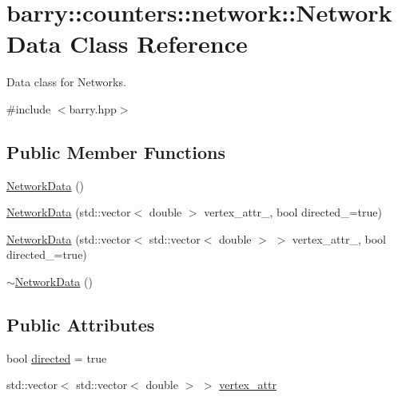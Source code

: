 \hypertarget{classbarry_1_1counters_1_1network_1_1_network_data}{}\section{barry\+:\+:counters\+:\+:network\+:\+:Network\+Data Class Reference}
\label{classbarry_1_1counters_1_1network_1_1_network_data}


Data class for Networks.  




{\ttfamily \#include $<$barry.\+hpp$>$}

\subsection*{Public Member Functions}
\begin{DoxyCompactItemize}
\item 
\hyperlink{classbarry_1_1counters_1_1network_1_1_network_data_a285d956b719012c5296aa537aca17fb2}{Network\+Data} ()
\item 
\hyperlink{classbarry_1_1counters_1_1network_1_1_network_data_a6db461d607e95bc04dfb527f3422142d}{Network\+Data} (std\+::vector$<$ double $>$ vertex\+\_\+attr\+\_\+, bool directed\+\_\+=true)
\item 
\hyperlink{classbarry_1_1counters_1_1network_1_1_network_data_ac37270f77de515f8a60a18b75a5bb60d}{Network\+Data} (std\+::vector$<$ std\+::vector$<$ double $>$ $>$ vertex\+\_\+attr\+\_\+, bool directed\+\_\+=true)
\item 
\hyperlink{classbarry_1_1counters_1_1network_1_1_network_data_a60bea8d32eea6cd2eca0de3a84257382}{$\sim$\+Network\+Data} ()
\end{DoxyCompactItemize}
\subsection*{Public Attributes}
\begin{DoxyCompactItemize}
\item 
bool \hyperlink{classbarry_1_1counters_1_1network_1_1_network_data_a9262461efbee895496824c0d09e1abbc}{directed} = true
\item 
std\+::vector$<$ std\+::vector$<$ double $>$ $>$ \hyperlink{classbarry_1_1counters_1_1network_1_1_network_data_ac3a4971ef7e4b087b29cf30e7ddb0ea8}{vertex\+\_\+attr}
\end{DoxyCompactItemize}


